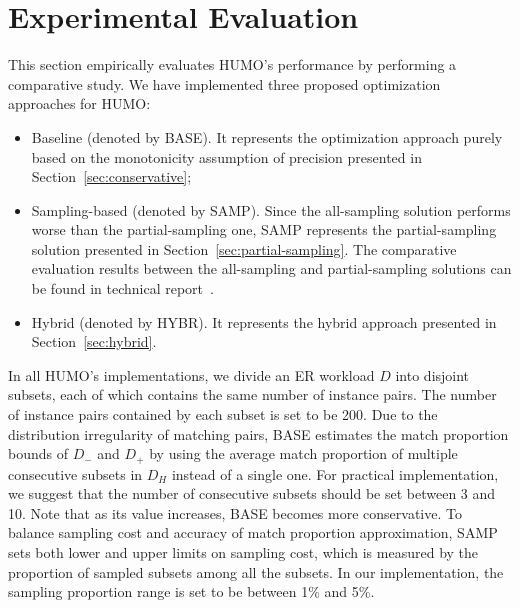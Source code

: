\section{\vspace{-0.1cm}Experimental Evaluation} \label{sec:experiment}

  This section empirically evaluates HUMO's performance by performing a comparative study. We have implemented three proposed optimization approaches for HUMO:
\begin{itemize}
\item Baseline (denoted by BASE). It represents the optimization approach purely based on the monotonicity assumption of precision presented in Section~\ref{sec:conservative};
\item Sampling-based (denoted by SAMP). Since the all-sampling solution performs worse than the partial-sampling one, SAMP represents the partial-sampling solution presented in Section~\ref{sec:partial-sampling}. The comparative evaluation results between the all-sampling and partial-sampling solutions can be found in technical report~\cite{chen2017humoreport}.
\item Hybrid  (denoted by HYBR). It represents the hybrid approach presented in Section~\ref{sec:hybrid}.
\end{itemize}

   		In all HUMO's implementations, we divide an ER workload $D$ into disjoint subsets, each of which contains the same number of instance pairs. The number of instance pairs contained by each subset is set to be 200. Due to the distribution irregularity of matching pairs, BASE estimates the match proportion bounds of $D_-$ and $D_+$ by using the average match proportion of multiple consecutive subsets in $D_H$ instead of a single one. For practical implementation, we suggest that the number of consecutive subsets should be set between 3 and 10. Note that as its value increases, BASE becomes more conservative. To balance sampling cost and accuracy of match proportion approximation, SAMP sets both lower and upper limits on sampling cost, which is measured by the proportion of sampled subsets among all the subsets. In our implementation, the sampling proportion range is set to be between 1\% and 5\%.

